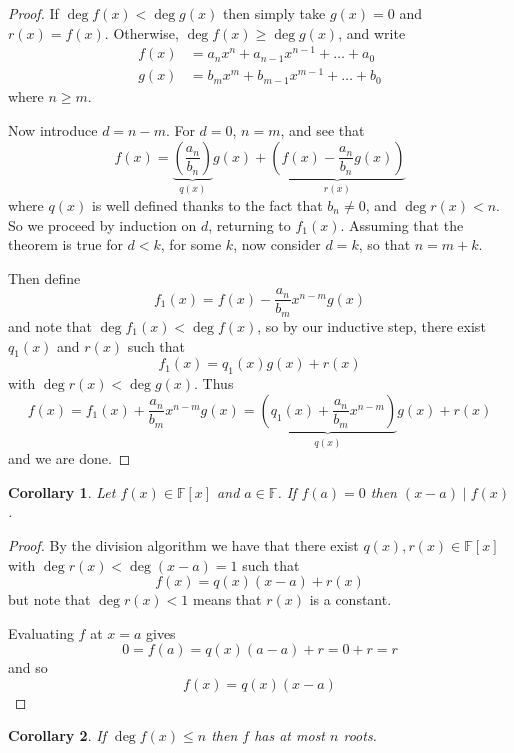 \documentclass[10pt,fleqn]{article}
\newcommand{\field}{\mathbb{F}}
\theoremstyle{definition} \newtheorem{defn}{Definition}[section]
\theoremstyle{plain}      \newtheorem{thm}[defn]{Theorem}
\theoremstyle{plain}      \newtheorem{prop}[defn]{Proposition}
\theoremstyle{plain}      \newtheorem{lem}[defn]{Lemma}
\theoremstyle{plain}      \newtheorem{cor}[defn]{Corollary}
\theoremstyle{plain}      \newtheorem{ad}[defn]{Addendum}
\theoremstyle{definition} \newtheorem{ex}[defn]{Example}
\theoremstyle{definition} \newtheorem{rem}[defn]{Remark}
\numberwithin{equation}{subsection}
\begin{document}
\begin{proof}
    If $\deg f(x)<\deg g(x)$ then simply take $g(x)=0$ and $r(x)=f(x)$.
    Otherwise, $\deg f(x)\geq\deg g(x)$, and write
    \begin{align*}
        f(x)
        &=
        a_nx^n+a_{n-1}x^{n-1}+\ldots+a_0\\
        g(x)
        &=
        b_mx^m+b_{m-1}x^{m-1}+\ldots+b_0
    \end{align*}
    where $n\geq m$.

    Now introduce $d=n-m$.
    For $d=0$, $n=m$, and see that
    \[
        f(x)=
        \underbrace{\left(\frac{a_n}{b_n}\right)}_{q(x)}g(x)+\underbrace{\left(f(x)-\frac{a_n}{b_n}g(x)\right)}_{r(x)}
    \]
    where $q(x)$ is well defined thanks to the fact that $b_n\neq0$, and $\deg r(x)<n$.
    So we proceed by induction on $d$, returning to $f_1(x)$.
    Assuming that the theorem is true for $d<k$, for some $k$, now consider $d=k$, so that $n=m+k$.

    Then define
    \[
        f_1(x)=
        f(x)-\frac{a_n}{b_m}x^{n-m}g(x)
    \]
    and note that $\deg f_1(x)<\deg f(x)$, so by our inductive step, there exist $q_1(x)$ and $r(x)$ such that
    \[
        f_1(x)=
        q_1(x)g(x)+r(x)
    \]
    with $\deg r(x)<\deg g(x)$.
    Thus
    \[
        f(x)=
        f_1(x)+\frac{a_n}{b_m}x^{n-m}g(x)=
        \underbrace{\left(q_1(x)+\frac{a_n}{b_m}x^{n-m}\right)}_{q(x)}g(x)+r(x)
    \]
    and we are done.
\end{proof}

\begin{cor}\label{roots-divide}
    Let $f(x)\in\field[x]$ and $a\in\field$.
    If $f(a)=0$ then $(x-a)\mid f(x)$.
\end{cor}

\begin{proof}
    By the division algorithm we have that there exist $q(x),r(x)\in\field[x]$ with $\deg r(x)<\deg (x-a)=1$ such that
    \[
        f(x)=
        q(x)(x-a)+r(x)
    \]
    but note that $\deg r(x)<1$ means that $r(x)$ is a constant.

    Evaluating $f$ at $x=a$ gives
    \[
        0=
        f(a)=
        q(x)(a-a)+r=
        0+r=
        r
    \]
    and so
    \[
        f(x)=
        q(x)(x-a)
    \]
\end{proof}

\begin{cor}
    If $\deg f(x)\leq n$ then $f$ has at most $n$ roots.
\end{cor}
\end{document}
